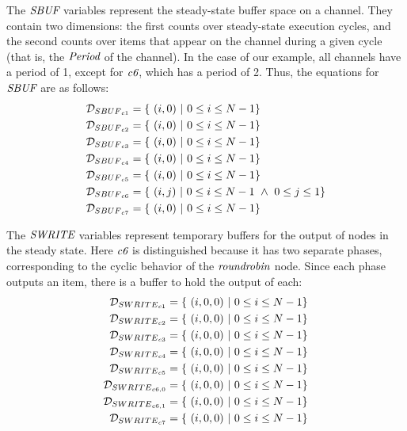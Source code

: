 The $\mbox{\it SBUF}$ variables represent the steady-state buffer space on a
channel.  They contain two dimensions: the first counts over
steady-state execution cycles, and the second counts over items that
appear on the channel during a given cycle (that is, the $\mbox{\it Period}$
of the channel).  In the case of our example, all channels have a
period of 1, except for $\mbox{\it c6}$, which has a period of 2.  Thus, the
equations for $\mbox{\it SBUF}$ are as follows:
\begin{align*}
{\cal D}_{{SBUF}_{c1}} &= \{ ~(i,0)~|~0 \le i \le N - 1\} \\
{\cal D}_{{SBUF}_{c2}} &= \{ ~(i,0)~|~0 \le i \le N - 1 \} \\
{\cal D}_{{SBUF}_{c3}} &= \{ ~(i,0)~|~0 \le i \le N - 1 \} \\
{\cal D}_{{SBUF}_{c4}} &= \{ ~(i,0)~|~0 \le i \le N - 1 \} \\
{\cal D}_{{SBUF}_{c5}} &= \{ ~(i,0)~|~0 \le i \le N - 1 \} \\
{\cal D}_{{SBUF}_{c6}} &= \{ ~(i,j)~|~0 \le i \le N - 1 ~\wedge~ 0 \le j \le 1 \} \\
{\cal D}_{{SBUF}_{c7}} &= \{ ~(i,0)~|~0 \le i \le N - 1\}
\end{align*}


The $\mbox{\it SWRITE}$ variables represent temporary buffers for the output
of nodes in the steady state.  Here $\mbox{\it c6}$ is distinguished
because it has two separate phases, corresponding to the cyclic
behavior of the $\mbox{\it roundrobin}$ node.  Since each phase outputs an
item, there is a buffer to hold the output of each:
\begin{align*}
{\cal D}_{{SWRITE}_{c1}} &= \{~(i,0,0)~|~0 \le i \le N-1\} \\
{\cal D}_{{SWRITE}_{c2}} &= \{~(i,0,0)~|~0 \le i \le N-1 \} \\
{\cal D}_{{SWRITE}_{c3}} &= \{~(i,0,0)~|~0 \le i \le N-1 \} \\
{\cal D}_{{SWRITE}_{c4}} &= \{~(i,0,0)~|~0 \le i \le N-1 \} \\
{\cal D}_{{SWRITE}_{c5}} &= \{~(i,0,0)~|~0 \le i \le N-1 \} \\
{\cal D}_{{SWRITE}_{{c6}, 0}} &= \{~(i,0,0)~|~0 \le i \le N-1 \} \\
{\cal D}_{{SWRITE}_{{c6}, 1}} &= \{~(i,0,0)~|~0 \le i \le N-1 \} \\
{\cal D}_{{SWRITE}_{c7}} &= \{~(i,0,0)~|~0 \le i \le N-1\} 
\end{align*}

